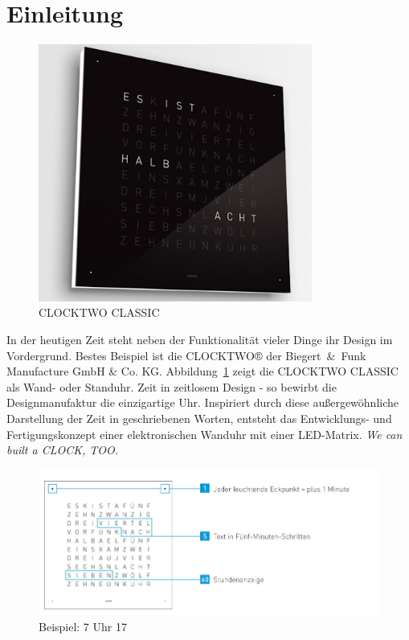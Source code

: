 
\section{Einleitung}
\label{sec:Einleitung}

\begin{figure}[t]
    \centering
    \includegraphics[width=9cm]{Abbildungen/qlocktwo-wand}
    \caption[ClockTwo]{CLOCKTWO CLASSIC}
    \label{fig:ClockTwo}
\end{figure}
%
 \begin{multicols}{2}
 In der heutigen Zeit steht neben der Funktionalität vieler Dinge ihr Design im Vordergrund. Bestes Beispiel ist die CLOCKTWO® der Biegert~\&~Funk Manufacture GmbH \& Co. KG. Abbildung~\ref{fig:ClockTwo} zeigt die CLOCKTWO CLASSIC als Wand- oder Standuhr. %
 Zeit in zeitlosem Design -   so bewirbt die Designmanufaktur die einzigartige Uhr.  Inspiriert durch diese außergewöhnliche Darstellung der Zeit in geschriebenen Worten, entsteht das Entwicklungs- und Fertigungskonzept einer elektronischen Wanduhr mit einer LED-Matrix. \textit{We can built a CLOCK, TOO.}
 \end{multicols}
 \begin{figure}[h]
    \centering
    \includegraphics[width=13cm]{Abbildungen/Uhrzeit_Beispiel}
    \caption[Uhrzeit_Bspl]{Beispiel: 7 Uhr 17}
    \label{fig:Uhrzeit_Bspl}
\end{figure}
